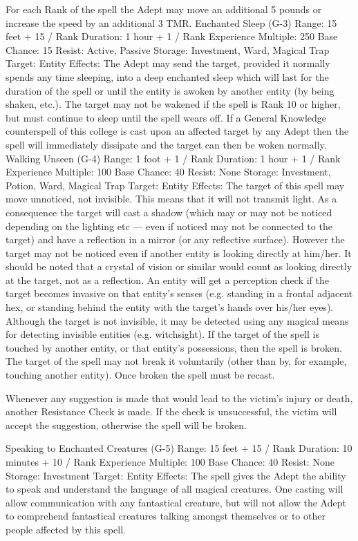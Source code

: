 \documentclass[a4paper]{article}
\begin{document}
\begin{multicols}{3}
For each Rank of the spell the Adept may move an
additional 5 pounds or increase the speed by an
additional 3 TMR.
Enchanted Sleep (G-3)
Range: 15 feet + 15 / Rank
Duration: 1 hour + 1 / Rank
Experience Multiple: 250
Base Chance: 15%
Resist: Active, Passive
Storage: Investment, Ward, Magical Trap
Target: Entity
Effects: The Adept may send the target, provided it
normally spends any time sleeping, into a deep
enchanted sleep which will last for the duration of
the spell or until the entity is awoken by another
entity (by being shaken, etc.). The target may not
be wakened if the spell is Rank 10 or higher, but
must continue to sleep until the spell wears off. If a
General Knowledge counterspell of this college is
cast upon an affected target by any Adept then the
spell will immediately dissipate and the target can
then be woken normally.
Walking Unseen (G-4)
Range: 1 foot + 1 / Rank
Duration: 1 hour + 1 / Rank
Experience Multiple: 100
Base Chance: 40%
Resist: None
Storage: Investment, Potion, Ward, Magical Trap
Target: Entity
Effects: The target of this spell may move unnoticed, not invisible. This means that it will not
transmit light. As a consequence the target will cast
a shadow (which may or may not be noticed depending on the lighting etc — even if noticed may
not be connected to the target) and have a reflection in a mirror (or any reflective surface). However the target may not be noticed even if another
entity is looking directly at him/her. It should be
noted that a crystal of vision or similar would
count as looking directly at the target, not as a
reflection. An entity will get a perception check if
the target becomes invasive on that entity’s senses
(e.g. standing in a frontal adjacent hex, or standing
behind the entity with the target’s hands over
his/her eyes). Although the target is not invisible, it
may be detected using any magical means for
detecting invisible entities (e.g. witchsight).
If the target of the spell is touched by another
entity, or that entity’s possessions, then the spell is
broken. The target of the spell may not break it
voluntarily (other than by, for example, touching
another entity). Once broken the spell must be
recast.

Whenever any suggestion is made that would lead
to the victim’s injury or death, another Resistance
Check is made. If the check is unsuccessful, the
victim will accept the suggestion, otherwise the
spell will be broken.

Speaking to Enchanted Creatures (G-5)
Range: 15 feet + 15 / Rank
Duration: 10 minutes + 10 / Rank
Experience Multiple: 100
Base Chance: 40%
Resist: None
Storage: Investment
Target: Entity
Effects: The spell gives the Adept the ability to
speak and understand the language of all magical
creatures. One casting will allow communication
with any fantastical creature, but will not allow the
Adept to comprehend fantastical creatures talking
amongst themselves or to other people affected by
this spell.


\end{multicols}
\end{document}
